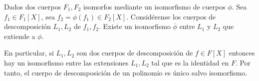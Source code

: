 \begin{theorem}
	Dados dos cuerpos $F_1,F_2$ isomorfos mediante un isomorfismo de cuerpos $\phi$. Sea $f_1 \in F_1[X]$, sea $f_2 = \phi(f_1) \in F_2[X]$. Considérense los cuerpos de descomposición $L_1,L_2$ de $f_1,f_2$. Existe un isomorfismo $\overline{\phi}$ entre $L_1$ y $L_2$ que extiende a $\phi$. 
	

	En particular, si $L_1,L_2$ son dos cuerpos de descomposición de $f \in F[X]$ entonces hay un isomorfismo entre las extensiones $L_1,L_2$ tal que es la identidad en $F$. Por tanto, el cuerpo de descomposición de un polinomio es único salvo isomorfismo. 
\end{theorem}
